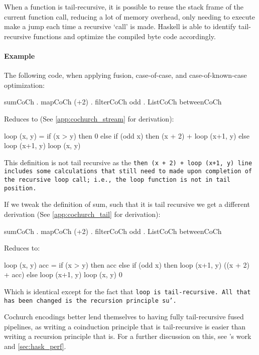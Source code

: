 When a function is tail-recursive, it is possible to reuse the stack frame of the current function call, reducing a lot of memory overhead, only needing to execute make a jump each time a recursive `call' is made.
Haskell is able to identify tail-recursive functions and optimize the compiled byte code accordingly.

\paragraph{Example}
The following code, when applying fusion, case-of-case, and case-of-known-case optimization:
\begin{spec}
sumCoCh . mapCoCh (+2) . filterCoCh odd . ListCoCh betweenCoCh
\end{spec}
Reduces to (See \autoref{app:cochurch_stream} for derivation):
\begin{spec}
loop (x, y) = if (x > y)
              then 0
              else if (odd x)
                   then (x + 2) + loop (x+1, y)
                   else loop (x+1, y)
loop (x, y)
\end{spec}
This definition is not tail recursive as the \tt{then (x + 2) + loop (x+1, y)} line includes some calculations that still need to made upon completion of the recursive \tt{loop} call; i.e., the \tt{loop} function is not in tail position.

If we tweak the definition of sum, such that it is tail recursive we get a different derivation (See \autoref{app:cochurch_tail} for derivation):
\begin{spec}
sumCoCh . mapCoCh (+2) . filterCoCh odd . ListCoCh betweenCoCh
\end{spec}
Reduces to:
\begin{spec}
loop (x, y) acc = if (x > y)
                  then acc
                  else if (odd x)
                       then loop (x+1, y) ((x + 2) + acc)
                       else loop (x+1, y)
loop (x, y) 0
\end{spec}
Which is identical except for the fact that \tt{loop} is tail-recursive.
All that has been changed is the recursion principle \tt{su'}.

Cochurch encodings better lend themselves to having fully tail-recursive fused pipelines, as writing a coinduction principle that is tail-recursive is easier than writing a recursion principle that is.
For a further discussion on this, see \cite{Breitner2018}'s work and \autoref{sec:hask_perf}.



